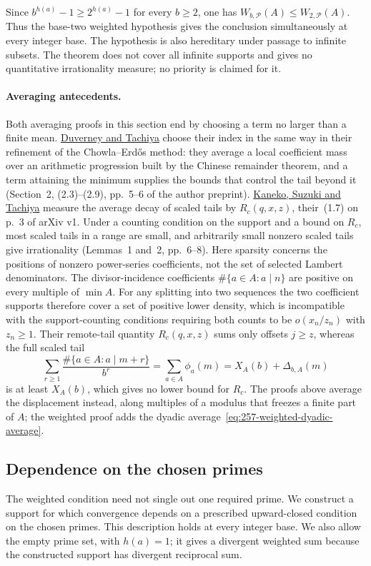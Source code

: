 \documentclass[11pt]{article}
\theoremstyle{plain}
\theoremstyle{definition}
\theoremstyle{remark}
\begin{document}
Since $b^{h(a)}-1\ge2^{h(a)}-1$ for every $b\ge2$, one has
$W_{b,\mathcal P}(A)\le W_{2,\mathcal P}(A)$.  Thus the base-two weighted
hypothesis gives the conclusion simultaneously at every integer base.  The
hypothesis is also hereditary under passage to infinite subsets.  The
theorem does not cover all infinite supports and gives no quantitative
irrationality measure; no priority is claimed for it.

\paragraph{Averaging antecedents.}
Both averaging proofs in this section end by choosing a term no larger than a
finite mean.
\href{https://danielduverney.fr/documents/theorie-des-nombres/DuverneyTachiya190522.pdf}{Duverney
and Tachiya} choose their index in the same way in their refinement of the
Chowla--Erd\H{o}s method: they average a local coefficient mass over an
arithmetic progression built by the Chinese remainder theorem, and a term
attaining the minimum supplies the bounds that control the tail beyond it
(Section~2, (2.3)--(2.9), pp.~5--6 of the author preprint).
\href{https://arxiv.org/abs/2601.20743}{Kaneko, Suzuki and Tachiya} measure
the average decay of scaled tails by $R_c(q,x,z)$, their~(1.7) on p.~3 of
arXiv v1.  Under a counting condition on the support and a bound on $R_c$,
most scaled tails in a range are small, and arbitrarily small nonzero scaled
tails give irrationality (Lemmas~1 and~2, pp.~6--8).
Here sparsity concerns the positions of nonzero power-series coefficients,
not the set of selected Lambert denominators. The divisor-incidence
coefficients $\#\{a\in A:a\mid n\}$ are positive on every multiple of
$\min A$.  For any splitting into two sequences the two coefficient supports
therefore cover a set of positive lower density, which is incompatible with the
support-counting conditions
\cite[Theorem~1(iii), p.~3, and Theorem~3(iv), p.~5]{kanekosuzukitachiya}
requiring both counts to be $o(x_n/z_n)$ with $z_n\ge1$.  Their remote-tail
quantity $R_c(q,x,z)$ sums only offsets $j\ge z$, whereas the full scaled tail
\[
 \sum_{r\ge1}\frac{\#\{a\in A:a\mid m+r\}}{b^r}
 =\sum_{a\in A}\phi_a(m)=X_A(b)+\Delta_{b,A}(m)
\]
is at least $X_A(b)$, which gives no lower bound for $R_c$.  The proofs above
average the displacement instead,
along multiples of a modulus that freezes a finite part of $A$; the weighted
proof adds the dyadic average~\eqref{eq:257-weighted-dyadic-average}.

\subsection{Dependence on the chosen primes}\label{sec:257-finite-witness-rules}
The weighted condition need not single out one required prime.
We construct a support for which convergence depends on a prescribed
upward-closed condition on the chosen primes. This description holds
at every integer base. We also allow the empty prime set, with
$h(a)=1$; it gives a divergent weighted sum because the constructed
support has divergent reciprocal sum.
\end{document}
